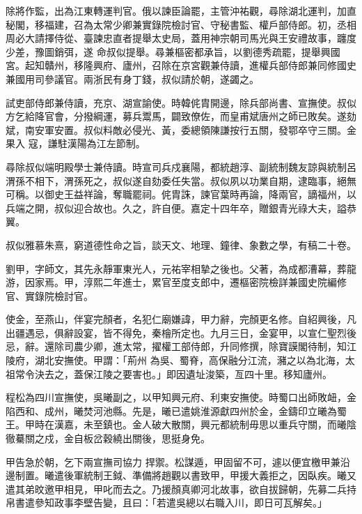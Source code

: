 \begin{pinyinscope}
 除將作監，出為江東轉運判官。俄以諫臣論罷，主管沖祐觀，尋除湖北運判，加直秘閣，移福建，召為太常少卿兼實錄院檢討官、守秘書監、權戶部侍郎。初，丞相周必大請擇侍從、臺諫忠直者提舉太史局，蓋用神宗朝司馬光與王安禮故事，躔度少差，豫圖銷弭，遂
 命叔似提舉。尋兼樞密都承旨，以劉德秀疏罷，提舉興國宮。起知贛州，移隆興府、廬州，召除在京宮觀兼侍讀，進權兵部侍郎兼同修國史兼國用司參議官。兩浙民有身丁錢，叔似請於朝，遂蠲之。



 試吏部侍郎兼侍讀，充京、湖宣諭使。時韓侂胄開邊，除兵部尚書、宣撫使。叔似方乞給降官會，分撥綱運，募兵鬻馬，闢致僚佐，而皇甫斌唐州之師已敗矣。遂劾斌，南安軍安置。叔似料敵必侵光、黃，委總領陳謙按行五關，發鄂卒守三關。金果入
 寇，謙駐漢陽為江左節制。



 尋除叔似端明殿學士兼侍讀。時宣司兵戍襄陽，都統趙淳、副統制魏友諒與統制呂渭孫不相下，渭孫死之，叔似遂自劾委任失當。叔似夙以功業自期，逮臨事，絕無可稱。以御史王益祥論，奪職罷祠。侂胄誅，諫官葉時再論，降兩官，謫福州，以兵端之開，叔似迎合故也。久之，許自便。嘉定十四年卒，贈銀青光祿大夫，謚恭翼。



 叔似雅慕朱熹，窮道德性命之旨，談天文、地理、鐘律、象數之學，有稿二十卷。



 劉甲，字師文，其先永靜軍東光人，元祐宰相摯之後也。父著，為成都漕幕，葬龍游，因家焉。甲，淳熙二年進士，累官至度支郎中，遷樞密院檢詳兼國史院編修官、實錄院檢討官。



 使金，至燕山，伴宴完顏者，名犯仁廟嫌諱，甲力辭，完顏更名修。自紹興後，凡出疆遇忌，俱辭設宴，皆不得免，秦檜所定也。九月三日，金宴甲，以宣仁聖烈後忌，辭。還除司農少卿，進太常，擢權工部侍郎，升同修撰，除寶謨閣待制，知江陵府，湖北安撫使。甲謂：「荊州
 為吳、蜀脊，高保融分江流，瀦之以為北海，太祖常令決去之，蓋保江陵之要害也。」即因遺址浚築，亙四十里。移知廬州。



 程松為四川宣撫使，吳曦副之，以甲知興元府、利東安撫使。時蜀口出師敗衄，金陷西和、成州，曦焚河池縣。先是，曦已遣姚淮源獻四州於金，金鑄印立曦為蜀王。甲時在漢嘉，未至鎮也。金人破大散關，興元都統制毋思以重兵守關，而曦陰徹驀關之戍，金自板岔穀繞出關後，思挺身免。



 甲告急於朝，乞下兩宣撫司協力
 捍禦。松謀遁，甲固留不可，遽以便宜檄甲兼沿邊制置。曦遣後軍統制王鉞、準備將趙觀以書致甲，甲援大義拒之，因臥疾。曦又遣其弟旼邀甲相見，甲叱而去之。乃援顏真卿河北故事，欲自拔歸朝，先募二兵持帛書遣參知政事李壁告變，且曰：「若遣吳總以右職入川，即日可瓦解矣。」




\end{pinyinscope}
